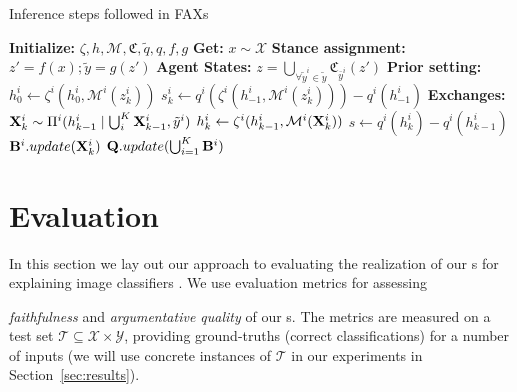 \begin{algorithm}[ht]
\caption{Inference steps followed in FAXs} 
\label{algo:VXs}
    \begin{algorithmic}[1]
        \State \textbf{Initialize:} $\zeta, h, \mathcal{M}, \mathfrak{C}, \tilde{q}, q, f, g$
        \State \textbf{Get:} $x \sim \mathcal{X}$
        \State \textbf{Stance assignment:} $z'=f(x); \tilde{y} = g(z')$
        \State \textbf{Agent States:} $z = \bigcup_{\forall \tilde{y}^i \in \tilde{y}} \mathfrak{C}_{\bar{y}^i}(z') $
        \State \textbf{Prior setting: }
        \State $h^i_0 \leftarrow \zeta^i(h^i_0, \mathcal{M}^i(z^i_k))$
        \State $s^i_k \leftarrow q^i(\zeta^i(h^i_{-1}, \mathcal{M}^i(z^i_k))) - q^i(h^i_{-1})$ 
        \EndFor
        \EndFor
        \State \textbf{Exchanges: }
        \State $\mathbf{X}^{i}_{k} \sim \Pi^i(h^i_{k-1} \mid \bigcup_i^K \mathbf{X}^{i}_{k-1}, \tilde{y}^i)$
        \State $h^i_{k} \leftarrow \zeta^i(h^i_{k-1}, \mathcal{M}^i(\mathbf{X}^{i}_{k}))$
        \State $s \leftarrow q^i(h^i_{k}) - q^i(h^i_{k-1})$
        \State $\mathbf{B}^{i}.update(\mathbf{X}^{i}_k)$
        \EndFor
        \State $\mathbf{Q}.update(\bigcup_{i=1}^K \mathbf{B}^{i})$
        \EndWhile
    \end{algorithmic}
    \label{alg:VXS}
\end{algorithm}
\fi

\section{Evaluation}
\label{sec:eval}

In this section we lay out our approach to evaluating the realization of our \FAXIC s %
for explaining image classifiers%
.
We 
use evaluation metrics %
for assessing 
\iffalse the suitability of %
the quantized classifier $q$, the codebooks/class-specific features and private classifiers, and their use by our \FAXIC s.
\fi
\emph{faithfulness} and \emph{argumentative quality} of our \FAXIC s.
The metrics are %
measured  %
on
a test set $\mathcal{T}\subseteq \mathcal{X}\times \mathcal{Y}$, providing ground-truths (correct classifications) for a number of inputs (we will use concrete instances of $\mathcal{T}$ in our experiments in Section~\ref{sec:results}).

